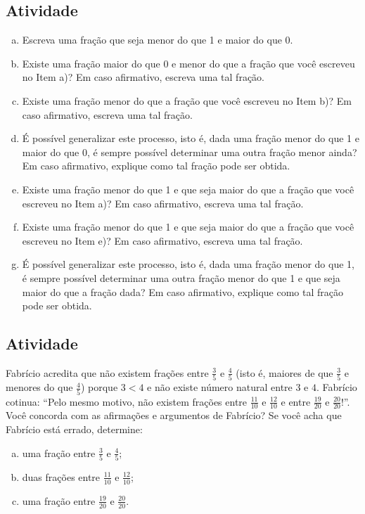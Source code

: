 \documentclass[a4,12pt]{book}
\begin{document}
\subsection{Atividade}
\begin{enumerate}[a)]
 \item Escreva uma fração que seja menor do que 1 e maior do que 0.
 \item Existe uma fração maior do que 0 e menor do que a fração que você escreveu no Item a)? Em caso afirmativo, escreva uma tal fração.
 \item Existe uma fração menor do que a fração que você escreveu no Item b)? Em caso afirmativo, escreva uma tal fração.
 \item É possível generalizar este processo, isto é, dada uma fração menor do que 1 e maior do que 0, é sempre possível determinar uma outra fração menor ainda? Em caso afirmativo, explique como tal fração pode ser obtida.
 \item Existe uma fração menor do que 1 e que seja maior do que a fração que você escreveu no Item a)? Em caso afirmativo, escreva uma tal fração.
 \item Existe uma fração menor do que 1 e que seja maior do que a fração que você escreveu no Item e)? Em caso afirmativo, escreva uma tal fração.
 \item É possível generalizar este processo, isto é, dada uma fração menor do que 1, é sempre possível determinar uma outra fração menor do que 1 e que seja maior do que a fração dada? Em caso afirmativo, explique como tal fração pode ser obtida.
\end{enumerate}

\subsection{Atividade}

Fabrício acredita que não existem frações entre $\frac{3}{5}$ e $\frac{4}{5}$ (isto é, maiores de que $\frac{3}{5}$ e menores do que $\frac{4}{5}$) porque $3 < 4$ e não existe número natural entre $3$ e $4$. Fabrício cotinua: ``Pelo mesmo motivo, não existem frações entre $\frac{11}{10}$ e $\frac{12}{10}$ e entre $\frac{19}{20}$ e $\frac{20}{20}$!''. Você concorda com as afirmações e argumentos de Fabrício? Se você acha que Fabrício está errado, determine:

\begin{enumerate}[a)]
\item  uma fração entre $\frac{3}{5}$ e $\frac{4}{5}$;

\item  duas frações entre $\frac{11}{10}$ e $\frac{12}{10}$;

\item  uma fração entre $\frac{19}{20}$ e $\frac{20}{20}$.
\end{enumerate}
\end{document}
